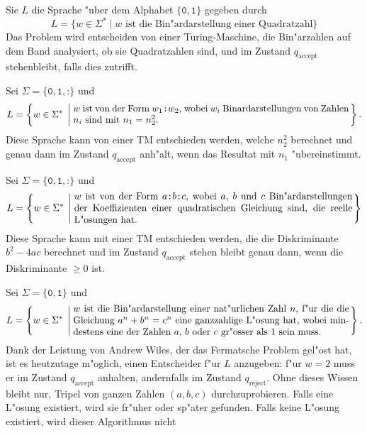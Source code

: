 \begin{loesung}
\begin{teilaufgaben}
\item Sie $L$ die Sprache "uber dem Alphabet $\{\texttt{0}, \texttt{1}\}$
gegeben durch
\[
L=\{ w\in\Sigma^*\;|\;
\text{$w$ ist die Bin"ardarstellung einer Quadratzahl}
\}
\]
Das Problem wird entscheiden von einer Turing-Maschine, die Bin"arzahlen auf
dem Band analysiert, ob sie Quadratzahlen sind, und im Zustand
$q_{\text{accept}}$ stehenbleibt, falls dies zutrifft.
\item
Sei $\Sigma=\{\texttt{0},\texttt{1},\texttt{:}\}$ und
\[
L=\left\{w\in\Sigma^*\;\left|\;
\begin{minipage}{4truein}
$w$ ist von der Form $w_1\texttt{:}w_2$, wobei $w_i$ Binardarstellungen
von Zahlen $n_i$ sind mit $n_1=n_2^2$.
\end{minipage}
\right.\right\}.
\]
Diese Sprache kann von einer TM entschieden werden, welche $n_2^2$ 
berechnet und genau dann im Zustand $q_{\text{accept}}$ anh"alt, wenn
das Resultat mit $n_1$ "ubereinstimmt.
\item 
Sei $\Sigma=\{\texttt{0},\texttt{1},\texttt{:}\}$ und 
\[
L=\left\{w\in\Sigma^*\;\left|\;
\begin{minipage}{4truein}
$w$ ist von der Form $a\texttt{:}b\texttt{:}c$, wobei $a$, $b$ und $c$
Bin"ardarstellungen der Koeffizienten einer quadratischen Gleichung sind,
die reelle L"osungen hat.
\end{minipage}
\right.\right\}
\]
Diese Sprache kann mit einer TM entschieden werden, die die Diskriminante
$b^2-4ac$ berechnet und im Zustand $q_{\text{accept}}$ stehen bleibt genau
dann, wenn die Diskriminante $\ge 0$ ist.
\item 
Sei $\Sigma=\{\texttt{0},\texttt{1}\}$ und
\[
L=\left\{ w\in\Sigma^*\;\left|\;
\begin{minipage}{4truein}
$w$ ist die Bin"ardarstellung einer nat"urlichen Zahl $n$, f"ur die
die Gleichung $a^n+b^n=c^n$ eine ganzzahlige L"osung hat, wobei mindestens
eine der Zahlen $a$, $b$ oder $c$ gr"osser als $1$ sein muss.
\end{minipage}
\right.\right\}.
\]
Dank der Leistung von Andrew Wiles, der das Fermatsche Problem gel"ost hat,
ist es heutzutage m"oglich, einen
Entscheider f"ur $L$ anzugeben: f"ur $w=2$ muss er im Zustand
$q_{\text{accept}}$ anhalten, andernfalls im Zustand $q_{\text{reject}}$.
Ohne dieses Wissen bleibt nur, Tripel von ganzen Zahlen $(a,b,c)$
durchzuprobieren. Falls eine L"osung existiert, wird sie fr"uher oder sp"ater
gefunden. Falls keine L"osung existiert, wird dieser Algorithmus nicht

\end{teilaufgaben}
\end{loesung}
